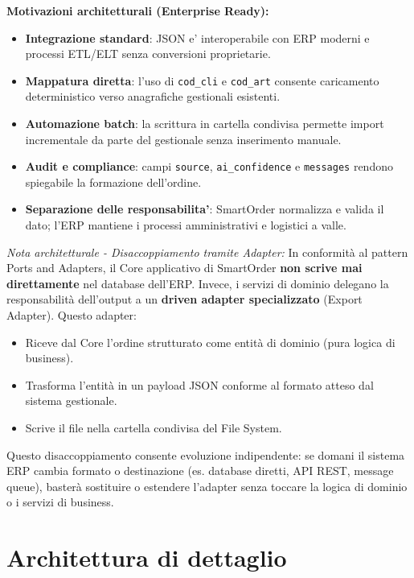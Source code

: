 \documentclass[a4paper, 11pt, oneside]{scrartcl}
\begin{document}
\noindent\textbf{Motivazioni architetturali (Enterprise Ready):}
\begin{itemize}
        \item \textbf{Integrazione standard}: JSON e' interoperabile con ERP moderni e processi ETL/ELT senza conversioni proprietarie.
        \item \textbf{Mappatura diretta}: l'uso di \texttt{cod\_cli} e \texttt{cod\_art} consente caricamento deterministico verso anagrafiche gestionali esistenti.
        \item \textbf{Automazione batch}: la scrittura in cartella condivisa permette import incrementale da parte del gestionale senza inserimento manuale.
        \item \textbf{Audit e compliance}: campi \texttt{source}, \texttt{ai\_confidence} e \texttt{messages} rendono spiegabile la formazione dell'ordine.
        \item \textbf{Separazione delle responsabilita'}: SmartOrder normalizza e valida il dato; l'ERP mantiene i processi amministrativi e logistici a valle.
\end{itemize}

\textit{Nota architetturale - Disaccoppiamento tramite Adapter:} In conformità al pattern Ports and Adapters, il Core applicativo di SmartOrder \textbf{non scrive mai direttamente} nel database dell'ERP. Invece, i servizi di dominio delegano la responsabilità dell'output a un \textbf{driven adapter specializzato} (Export Adapter). Questo adapter:
\begin{itemize}
    \item Riceve dal Core l'ordine strutturato come entità di dominio (pura logica di business).
    \item Trasforma l'entità in un payload JSON conforme al formato atteso dal sistema gestionale.
    \item Scrive il file nella cartella condivisa del File System.
\end{itemize}
Questo disaccoppiamento consente evoluzione indipendente: se domani il sistema ERP cambia formato o destinazione (es. database diretti, API REST, message queue), basterà sostituire o estendere l'adapter senza toccare la logica di dominio o i servizi di business.

\newpage
\section{Architettura di dettaglio}
\end{document}
